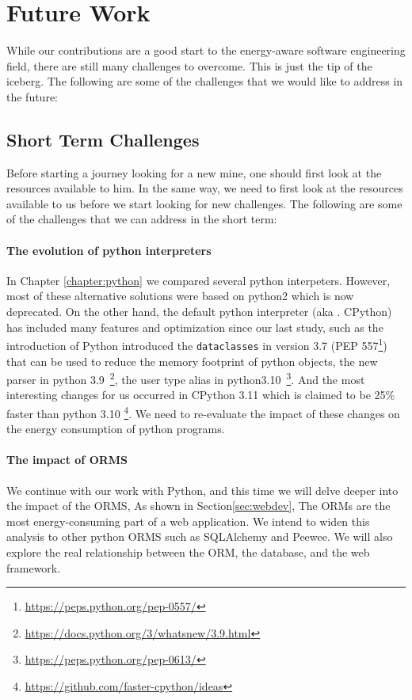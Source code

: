 \section{Future Work}
While our contributions are a good start to the energy-aware software engineering field, there are still many challenges to overcome. This is just the tip of the iceberg. The following are some of the challenges that we would like to address in the future:

\subsection{Short Term Challenges}
Before starting a journey looking for a new mine, one should first look at the resources available to him. In the same way, we need to first look at the resources available to us before we start looking for new challenges. The following are some of the challenges that we can address in the short term:

\paragraph{The evolution of python interpreters}
In Chapter \ref{chapter:python} we compared several python interpeters. However, most of these alternative solutions were based on python2 which is now deprecated. On the other hand, the default python interpreter (aka . CPython) has included many features and optimization since our last study, such as the introduction of Python introduced the \texttt{dataclasses} in version 3.7 (PEP 557\footnote{\url{https://peps.python.org/pep-0557/}}) that can be used to reduce the memory footprint of python objects,
the new parser in python 3.9~\footnote{\url{https://docs.python.org/3/whatsnew/3.9.html}}, the user type alias in python3.10~\footnote{\url{https://peps.python.org/pep-0613/}}.
And the most interesting changes for us occurred in CPython 3.11 which is claimed to be 25\% faster than python 3.10 \footnote{\url{https://github.com/faster-cpython/ideas}}. We need to re-evaluate the impact of these changes on the energy consumption of python programs.

\paragraph{The impact of ORMS}
We continue with our work with Python, and this time we will delve deeper into the impact of the ORMS, As shown in Section\ref{sec:webdev}, The ORMs are the most energy-consuming part of a web application. We intend to widen this analysis to other python ORMS such as SQLAlchemy and Peewee. We will also explore the real relationship between the ORM, the database, and the web framework.

